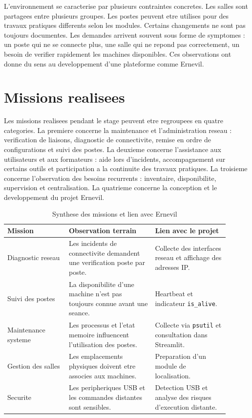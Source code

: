 \documentclass[12pt,a4paper]{report}
\begin{document}
L'environnement se caracterise par plusieurs contraintes concretes. Les salles sont partagees entre plusieurs groupes. Les postes peuvent etre utilises pour des travaux pratiques differents selon les modules. Certains changements ne sont pas toujours documentes. Les demandes arrivent souvent sous forme de symptomes : un poste qui ne se connecte plus, une salle qui ne repond pas correctement, un besoin de verifier rapidement les machines disponibles. Ces observations ont donne du sens au developpement d'une plateforme comme Ernevil.

\section{Missions realisees}
Les missions realisees pendant le stage peuvent etre regroupees en quatre categories. La premiere concerne la maintenance et l'administration reseau : verification de liaisons, diagnostic de connectivite, remise en ordre de configurations et suivi des postes. La deuxieme concerne l'assistance aux utilisateurs et aux formateurs : aide lors d'incidents, accompagnement sur certains outils et participation a la continuite des travaux pratiques. La troisieme concerne l'observation des besoins recurrents : inventaire, disponibilite, supervision et centralisation. La quatrieme concerne la conception et le developpement du projet Ernevil.

\begin{longtable}{p{0.25\linewidth}p{0.35\linewidth}p{0.30\linewidth}}
\caption{Synthese des missions et lien avec Ernevil}\\
\toprule
\textbf{Mission} & \textbf{Observation terrain} & \textbf{Lien avec le projet}\\
\midrule
Diagnostic reseau & Les incidents de connectivite demandent une verification poste par poste. & Collecte des interfaces reseau et affichage des adresses IP.\\
Suivi des postes & La disponibilite d'une machine n'est pas toujours connue avant une seance. & Heartbeat et indicateur \texttt{is\_alive}.\\
Maintenance systeme & Les processus et l'etat memoire influencent l'utilisation des postes. & Collecte via \texttt{psutil} et consultation dans Streamlit.\\
Gestion des salles & Les emplacements physiques doivent etre associes aux machines. & Preparation d'un module de localisation.\\
Securite & Les peripheriques USB et les commandes distantes sont sensibles. & Detection USB et analyse des risques d'execution distante.\\
\bottomrule
\end{longtable}
\end{document}
